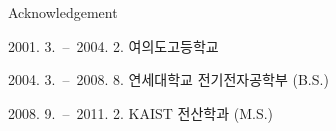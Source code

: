 \documentclass[master,english,final]{kaist-ucs}
\begin{document}




\acknowledgement

Acknowledgement


\curriculumvitae[korean]

    \begin{personaldata}
        \address    {서울특별시 영등포구 여의도동 대교아파트 5동 1213호}
    \end{personaldata}

    \begin{education}
        \item[2001. 3.\ --\ 2004. 2.] 여의도고등학교
        \item[2004. 3.\ --\ 2008. 8.] 연세대학교 전기전자공학부 (B.S.)
        \item[2008. 9.\ --\ 2011. 2.] KAIST 전산학과 (M.S.)
    \end{education}


\end{document}

